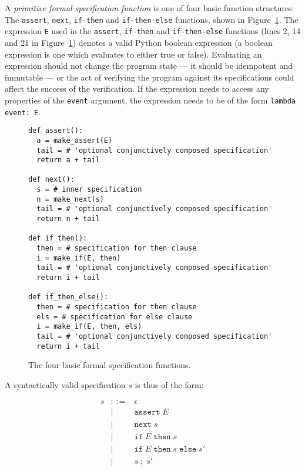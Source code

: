 A \textit{primitive formal specification function} is one of four basic
function structures: The \texttt{assert}, \texttt{next}, \texttt{if-then} and
\texttt{if-then-else} functions, shown in
Figure~\ref{figure-basic-formal-specification-functions}. The expression
\texttt{E} used in the \texttt{assert}, \texttt{if-then} and
\texttt{if-then-else} functions (lines 2, 14 and 21 in
Figure~\ref{figure-basic-formal-specification-functions}) denotes a valid
Python boolean expression (a boolean expression is one which evaluates to
either true or false). Evaluating an expression should not change the program
state --- it should be idempotent and immutable --- or the act of verifying the
program against its specifications could affect the success of the
verification. If the expression needs to access any properties of the
\texttt{event} argument, the expression needs to be of the form
\texttt{lambda event: E}.

\begin{figure}[h!]
	\begin{center}
	\begin{minipage}{0.7\textwidth}
	\begin{lstlisting}
def assert():
  a = make_assert(E)
  tail = # 'optional conjunctively composed specification'
  return a + tail

def next():
  s = # inner specification
  n = make_next(s)
  tail = # 'optional conjunctively composed specification'
  return n + tail

def if_then():
  then = # specification for then clause
  i = make_if(E, then)
  tail = # 'optional conjunctively composed specification'
  return i + tail

def if_then_else():
  then = # specification for then clause
  els = # specification for else clause
  i = make_if(E, then, els)
  tail = # 'optional conjunctively composed specification'
  return i + tail
	\end{lstlisting}
	\end{minipage}
	\end{center}

	\caption{The four basic formal specification functions.}
	\label{figure-basic-formal-specification-functions}
\end{figure}


A syntactically valid specification $s$ is thus of the form:

\medskip
\[
  \begin{array}{rrl}
    s & ::= & \epsilon \\
      &   | & \texttt{assert} \; E \\
      &   | & \texttt{next} \; s \\
      &   | & \texttt{if} \; E \; \texttt{then} \; s \\
      &   | & \texttt{if} \; E \; \texttt{then} \; s \; \texttt{else} \; s' \\
      &   | & s \; ; \; s'
  \end{array}
\]
\medskip

